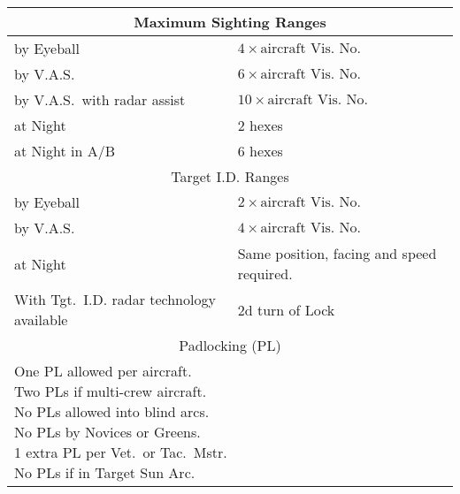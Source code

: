 
\begin{onecolumntablefloat}
\begin{onecolumntable}
\begin{tabularx}{\linewidth}{p{12em}X}
\toprule
\multicolumn{2}{c}{Maximum Sighting Ranges}\\
\midrule
by Eyeball&$4 \times \mbox{aircraft Vis.\ No.}$\\
by V.A.S. &$6 \times \mbox{aircraft Vis.\ No.}$\\
by V.A.S.\ with radar assist&$10 \times \mbox{aircraft Vis.\ No.}$\\
at Night&2 hexes\\
at Night in A/B&6 hexes\\
\midrule
\multicolumn{2}{c}{Target I.D. Ranges}\\
\midrule
by Eyeball&$2 \times \mbox{aircraft Vis.\ No.}$\\
by V.A.S. &$4 \times \mbox{aircraft Vis.\ No.}$\\
at Night&Same position, facing and speed required.\\
With Tgt.\ I.D. radar technology available&2d turn of Lock\\
\midrule
\multicolumn{2}{c}{Padlocking (PL)}\\
\midrule
\multicolumn{2}{p{24em}}{
One PL allowed per aircraft.\newline
Two PLs if multi-crew aircraft.\newline
No PLs allowed into blind arcs.\newline
No PLs by Novices or Greens.\newline
1 extra PL per Vet.\ or Tac.\ Mstr.\newline
No PLs if in Target Sun Arc.
}\\
\bottomrule
\end{tabularx}
\end{onecolumntable}
\end{onecolumntablefloat}
